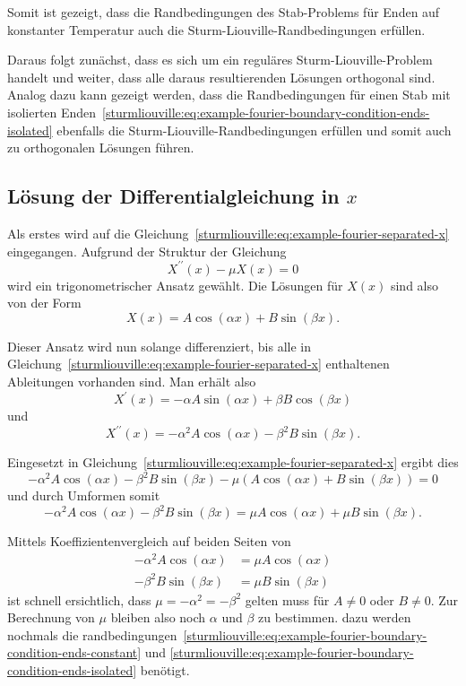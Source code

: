 Somit ist gezeigt, dass die Randbedingungen des Stab-Problems für Enden auf
konstanter Temperatur auch die Sturm-Liouville-Randbedingungen erfüllen.

Daraus folgt zunächst, dass es sich um ein reguläres Sturm-Liouville-Problem
handelt und weiter, dass alle daraus resultierenden Lösungen orthogonal sind.
Analog dazu kann gezeigt werden, dass die Randbedingungen für einen Stab mit
isolierten
Enden~\eqref{sturmliouville:eq:example-fourier-boundary-condition-ends-isolated}
ebenfalls die Sturm-Liouville-Randbedingungen erfüllen und
somit auch zu orthogonalen Lösungen führen.

%
%

\subsection{Lösung der Differentialgleichung in \texorpdfstring{$x$}{x}}
Als erstes wird auf die
Gleichung~\eqref{sturmliouville:eq:example-fourier-separated-x} eingegangen.
Aufgrund der Struktur der Gleichung
\[
    X^{\prime \prime}(x) - \mu X(x)
    =
    0
\]
wird ein trigonometrischer Ansatz gewählt.
Die Lösungen für $X(x)$ sind also von der Form
\[
    X(x)
    =
    A \cos ( \alpha x) + B \sin ( \beta x).
\]

Dieser Ansatz wird nun solange differenziert, bis alle in
Gleichung~\eqref{sturmliouville:eq:example-fourier-separated-x} enthaltenen
Ableitungen vorhanden sind.
Man erhält also
\[
    X^{\prime}(x)
    =
    - \alpha A \sin ( \alpha x ) +
    \beta B \cos ( \beta x )
\]
und
\[
    X^{\prime \prime}(x)
    =
    -\alpha^{2} A \cos ( \alpha x ) -
    \beta^{2} B \sin ( \beta x ).
\]

Eingesetzt in Gleichung~\eqref{sturmliouville:eq:example-fourier-separated-x}
ergibt dies
\[
    -\alpha^{2}A\cos(\alpha x) - \beta^{2}B\sin(\beta x) -
    \mu(A\cos(\alpha x) + B\sin(\beta x))
    =
    0
\]
und durch Umformen somit
\[
    -\alpha^{2}A\cos(\alpha x) - \beta^{2}B\sin(\beta x)
    =
    \mu A\cos(\alpha x) + \mu B\sin(\beta x).
\]

Mittels Koeffizientenvergleich auf beiden Seiten von
\[
\begin{aligned}
    -\alpha^{2}A\cos(\alpha x)
    &=
    \mu A\cos(\alpha x)
    \\
    -\beta^{2}B\sin(\beta x)
    &=
    \mu B\sin(\beta x)
\end{aligned}
\]
ist schnell ersichtlich, dass $ \mu = -\alpha^{2} = -\beta^{2} $ gelten muss für
$ A \neq 0 $ oder $ B \neq 0 $.
Zur Berechnung von $ \mu $ bleiben also noch  $ \alpha $ und $ \beta $ zu
bestimmen.
dazu werden nochmals die
randbedingungen~\eqref{sturmliouville:eq:example-fourier-boundary-condition-ends-constant} 
und \eqref{sturmliouville:eq:example-fourier-boundary-condition-ends-isolated}
benötigt.

